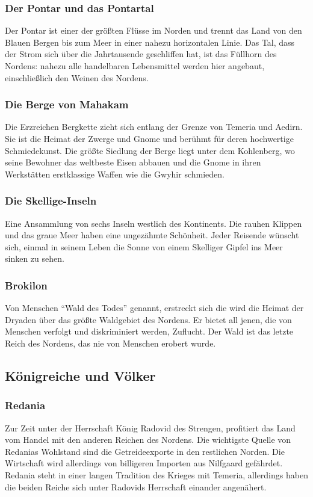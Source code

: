 \documentclass[parskip=full,11pt,%
footheight=38pt]{scrreport}
\begin{document}
	\subsubsection{Der Pontar und das Pontartal}
	Der Pontar ist einer der größten Flüsse im Norden und trennt das Land von den Blauen Bergen bis zum Meer in einer nahezu horizontalen Linie. Das Tal, dass der Strom sich über die Jahrtausende geschliffen hat, ist das Füllhorn des Nordens: nahezu alle handelbaren Lebensmittel werden hier angebaut, einschließlich den Weinen des Nordens.

	\subsubsection{Die Berge von Mahakam}
	Die Erzreichen Bergkette zieht sich entlang der Grenze von Temeria und Aedirn. Sie ist die Heimat der Zwerge und Gnome und berühmt für deren hochwertige Schmiedekunst. Die größte Siedlung der Berge liegt unter dem Kohlenberg, wo seine Bewohner das weltbeste Eisen abbauen und die Gnome in ihren Werkstätten erstklassige Waffen wie die Gwyhir schmieden.

	\subsubsection{Die Skellige-Inseln}
	Eine Ansammlung von sechs Inseln westlich des Kontinents. Die rauhen Klippen und das graue Meer haben eine ungezähmte Schönheit. Jeder Reisende wünscht sich, einmal in seinem Leben die Sonne von einem Skelliger Gipfel ins Meer sinken zu sehen.

	\subsubsection{Brokilon}
	Von Menschen ``Wald des Todes'' genannt, erstreckt sich die wird die Heimat der Dryaden über das größte Waldgebiet des Nordens. Er bietet all jenen, die von Menschen verfolgt und diskriminiert werden, Zuflucht. Der Wald ist das letzte Reich des Nordens, das nie von Menschen erobert wurde.

	\subsection{Königreiche und Völker}
	\subsubsection{Redania}
	Zur Zeit unter der Herrschaft König Radovid des Strengen, profitiert das Land vom Handel mit den anderen Reichen des Nordens. Die wichtigste Quelle von Redanias Wohlstand sind die Getreideexporte in den restlichen Norden. Die Wirtschaft wird allerdings von billigeren Importen aus Nilfgaard gefährdet. Redania steht in einer langen Tradition des Krieges mit Temeria, allerdings haben die beiden Reiche sich unter Radovids Herrschaft einander angenähert.
\end{document}

